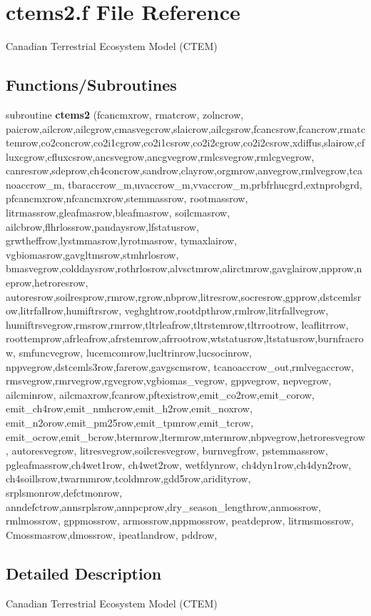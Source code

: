 \hypertarget{ctems2_8f}{}\section{ctems2.\+f File Reference}
\label{ctems2_8f}


Canadian Terrestrial Ecosystem Model (C\+T\+E\+M)  


\subsection*{Functions/\+Subroutines}
\begin{DoxyCompactItemize}
\item 
\hypertarget{ctems2_8f_a2ead77d4e4c1c98dba5fa0ea0ba82d5e}{}subroutine {\bfseries ctems2} (fcancmxrow, rmatcrow, zolncrow, paicrow,ailcrow,ailcgrow,cmasvegcrow,slaicrow,ailcgsrow,fcancsrow,fcancrow,rmatctemrow,co2concrow,co2i1cgrow,co2i1csrow,co2i2cgrow,co2i2csrow,xdiffus,slairow,cfluxcgrow,cfluxcsrow,ancsvegrow,ancgvegrow,rmlcsvegrow,rmlcgvegrow, canresrow,sdeprow,ch4concrow,sandrow,clayrow,orgmrow,anvegrow,rmlvegrow,tcanoaccrow\+\_\+m, tbaraccrow\+\_\+m,uvaccrow\+\_\+m,vvaccrow\+\_\+m,prbfrhucgrd,extnprobgrd, pfcancmxrow,nfcancmxrow,stemmassrow, rootmassrow, litrmassrow,gleafmasrow,bleafmasrow, soilcmasrow, ailcbrow,flhrlossrow,pandaysrow,lfstatusrow, grwtheffrow,lystmmasrow,lyrotmasrow, tymaxlairow, vgbiomasrow,gavgltmsrow,stmhrlosrow, bmasvegrow,colddaysrow,rothrlosrow,alvsctmrow,alirctmrow,gavglairow,npprow,neprow,hetroresrow, autoresrow,soilresprow,rmrow,rgrow,nbprow,litresrow,socresrow,gpprow,dstcemlsrow,litrfallrow,humiftrsrow, veghghtrow,rootdpthrow,rmlrow,litrfallvegrow, humiftrsvegrow,rmsrow,rmrrow,tltrleafrow,tltrstemrow,tltrrootrow, leaflitrrow, roottemprow,afrleafrow,afrstemrow,afrrootrow,wtstatusrow,ltstatusrow,burnfracrow, smfuncvegrow, lucemcomrow,lucltrinrow,lucsocinrow, nppvegrow,dstcemls3row,farerow,gavgscmsrow, tcanoaccrow\+\_\+out,rmlvegaccrow, rmsvegrow,rmrvegrow,rgvegrow,vgbiomas\+\_\+vegrow, gppvegrow, nepvegrow, ailcminrow, ailcmaxrow,fcanrow,pftexistrow,emit\+\_\+co2row,emit\+\_\+corow, emit\+\_\+ch4row,emit\+\_\+nmhcrow,emit\+\_\+h2row,emit\+\_\+noxrow, emit\+\_\+n2orow,emit\+\_\+pm25row,emit\+\_\+tpmrow,emit\+\_\+tcrow, emit\+\_\+ocrow,emit\+\_\+bcrow,btermrow,ltermrow,mtermrow,nbpvegrow,hetroresvegrow, autoresvegrow, litresvegrow,soilcresvegrow, burnvegfrow, pstemmassrow, pgleafmassrow,ch4wet1row, ch4wet2row, wetfdynrow, ch4dyn1row,ch4dyn2row, ch4soillsrow,twarmmrow,tcoldmrow,gdd5row,aridityrow, srplsmonrow,defctmonrow, anndefctrow,annsrplsrow,annpcprow,dry\+\_\+season\+\_\+lengthrow,anmossrow, rmlmossrow, gppmossrow, armossrow,nppmossrow, peatdeprow, litrmsmossrow, Cmossmasrow,dmossrow, ipeatlandrow, pddrow,\label{ctems2_8f_a2ead77d4e4c1c98dba5fa0ea0ba82d5e}

\end{DoxyCompactItemize}


\subsection{Detailed Description}
Canadian Terrestrial Ecosystem Model (C\+T\+E\+M) 

